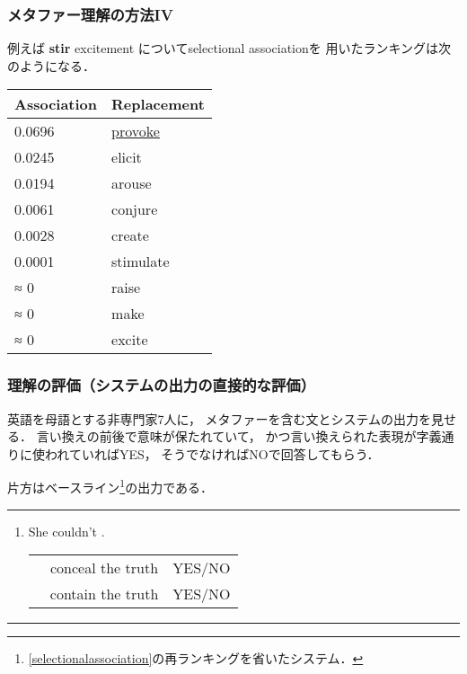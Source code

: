 \documentclass[11pt]{beamer}
\newlength{\la}
\newcommand\enumref[1]{\textcolor{sRed}{\ref{#1}}}
\newcommand\metaphorical[1]{\textcolor{sRed}{\textbf{#1}}}
\newcommand\thc[1]{\multicolumn{1}{c}{\textbf{#1}}}
\begin{document}
\begin{frame}
\frametitle{メタファー理解の方法IV}
    例えば \metaphorical{stir} excitement についてselectional associationを
    用いたランキングは次のようになる．

    \bigskip

    \begingroup
    \scriptsize
    \begin{center}
        \begin{tabular}{ll}
            \toprule
            \thc{Association} &
                \thc{Replacement} \\
            \midrule
            0.0696 & \underline{provoke} \\
            0.0245 & elicit \\
            0.0194 & arouse \\
            0.0061 & conjure \\
            0.0028 & create \\
            0.0001 & stimulate \\
            ≈ 0    & raise \\
            ≈ 0    & make \\
            ≈ 0    & excite \\
            \bottomrule
        \end{tabular}
    \end{center}
    \endgroup
\end{frame}

\begin{frame}
\frametitle{理解の評価（システムの出力の直接的な評価）}
英語を母語とする非専門家7人に，
メタファーを含む文とシステムの出力を見せる．
言い換えの前後で意味が保たれていて，
かつ言い換えられた表現が字義通りに使われていればYES，
そうでなければNOで回答してもらう．

片方はベースライン\footnote[frame]{\enumref{selectionalassociation}の再ランキングを省いたシステム．}の出力である．
\rule{\textwidth}{1pt}
\vspace{-\topsep}
\begin{enumerate}
    \item She couldn’t .

    \begin{tabular}{ccc}
        & \textcolor{sBrown}{conceal the truth} & \textcolor{sBrown}{YES/NO} \\
        & \textcolor{sBrown}{contain the truth} & \textcolor{sBrown}{YES/NO} \\
    \end{tabular}

\end{enumerate}
\rule{\textwidth}{1pt}
\end{frame}
\end{document}
